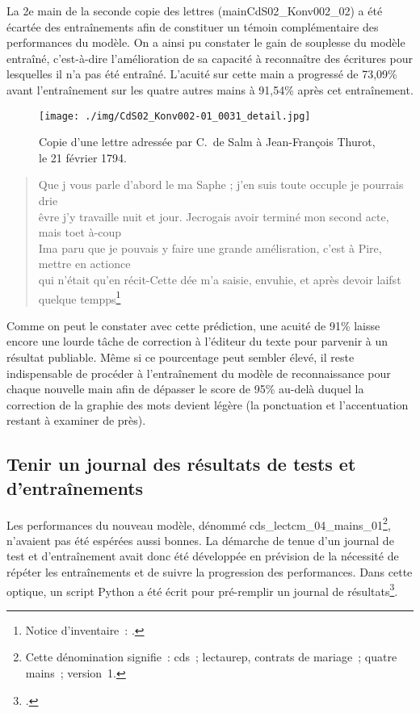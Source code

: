 \documentclass[a4paper,12pt,twoside]{book}
\begin{document}
				La 2e main de la seconde copie des lettres (\textsf{mainCdS02\_Konv002\_02}) a été écartée des entraînements afin de constituer un témoin complémentaire des performances du modèle. On a ainsi pu constater le gain de souplesse du modèle entraîné, c'est-à-dire l'amélioration de sa capacité à reconnaître des écritures pour lesquelles il n'a pas été entraîné. L'acuité sur cette main a progressé de 73,09\% avant l'entraînement sur les quatre autres mains à 91,54\% après cet entraînement.
				
				\begin{figure}[!h]
					\centering
					\texttt{[image: ./img/CdS02\_Konv002-01\_0031\_detail.jpg]}%
					\caption{Copie d'une lettre adressée par C.~de Salm à Jean-François Thurot, le 21 février 1794.}%
					\label{}%
				\end{figure}
				
				\begin{quote}
					\scriptsize \textsf{Que j vous parle d'abord le ma Saphe ; j'en suis toute occuple je pourrais drie\\
					êvre j'y travaille nuit et jour. Jecrogais avoir terminé mon second acte, mais toet à-coup\\
					Ima paru que je pouvais y faire une grande amélisration, c'est à Pire, mettre en actionce\\
					qui n'était qu'en récit-Cette dée m'a saisie, envuhie, et après devoir laifst quelque tempps}\footnote{Notice d'inventaire~: \cite{CdS02031032}.}
				\end{quote}
			
				Comme on peut le constater avec cette \gls{prédiction}, une acuité de 91\% laisse encore une lourde tâche de correction à l'éditeur du texte pour parvenir à un résultat publiable. Même si ce pourcentage peut sembler élevé, il reste indispensable de procéder à l'entraînement du modèle de reconnaissance pour chaque nouvelle main afin de dépasser le score de 95\% au-delà duquel la correction de la graphie des mots devient légère (la ponctuation et l'accentuation restant à examiner de près).
			
			\subsection{Tenir un journal des résultats de tests et d'entraînements}
				\label{journal-test}
				Les performances du nouveau modèle, dénommé \textsf{cds\_lectcm\_04\_mains\_01}\footnote{Cette dénomination signifie~: \gls{cds}~; \gls{lectaurep}, contrats de mariage~; quatre mains~; version~1.}, n'avaient pas été espérées aussi bonnes. La démarche de tenue d'un journal de test et d'entraînement avait donc été développée en prévision de la nécessité de répéter les entraînements et de suivre la progression des performances. Dans cette optique, un script Python a été écrit pour pré-remplir un journal de résultats\footcite{biayJournalReconnPy2022}. 
				
\end{document}
